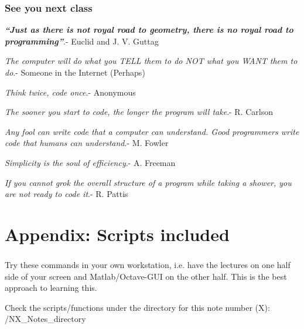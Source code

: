 \documentclass[11pt]{beamer}
\newif\ifplacelogo %
\begin{document}
\placelogotrue
%
\begin{frame}
\frametitle{See you next class}
\vspace{-25pt}

\textbf{\textit{``Just as there is not royal road to geometry, there is no royal road to programming''}}.- Euclid and J. V. Guttag
\vspace{7pt}

\textit{The computer will do what you TELL them to do NOT what you WANT them to do}.- Someone in the Internet (Perhaps)
\vspace{7pt}	

\textit{Think twice, code once}.- Anonymous
\vspace{7pt}

\textit{The sooner you start to code, the longer the program will take}.- R. Carlson\vspace{7pt}

\textit{Any fool can write code that a computer can understand. Good programmers write code that humans can understand}.- M. Fowler
\vspace{7pt}

\textit{Simplicity is the soul of efficiency}.- A. Freeman
\vspace{7pt}

\textit{If you cannot grok the overall structure of a program while taking a shower, you are not ready to code it}.- R. Pattis

\end{frame}


\placelogofalse


\section{Appendix: Scripts included}


\begin{frame}
\frametitle{\secname}

\vspace{-7pt}


\vspace{-7pt}
\begin{exampleblock}{}
	Try these commands in your own workstation, i.e. have the lectures on one half side of your screen and Matlab/Octave-GUI on the other half. This is the best approach to learning this.   
\end{exampleblock}

\begin{alertblock}{}
	Check the scripts/functions under the directory for this note number (X): \newline
	 /NX\_Notes\_directory
\end{alertblock}

\end{frame}	
\end{document}
